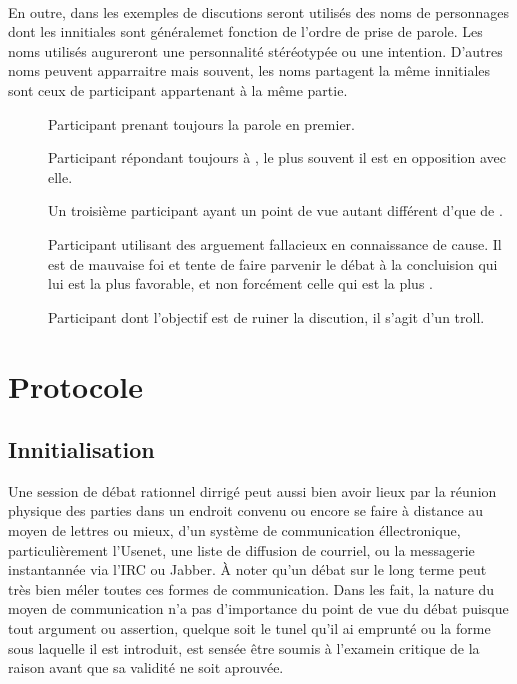 \paragraph{}
En outre, dans les exemples de discutions seront utilisés des noms de personnages dont les innitiales sont généralemet fonction de l’ordre de prise de parole. Les noms utilisés augureront une personnalité stéréotypée ou une intention. D’autres noms peuvent apparraitre mais souvent, les noms partagent la même innitiales sont ceux de participant appartenant à la même partie.

\begin{description}
  \item[\A] Participant prenant toujours la parole en premier.
  \item[\B] Participant répondant toujours à \A, le plus souvent il est en opposition avec elle.
  \item[\C] Un troisième participant ayant un point de vue autant différent d’\A que de \B.
  \item[\Sophist] Participant utilisant des arguement fallacieux en connaissance de cause. Il est de mauvaise foi et tente de faire parvenir le débat à la concluision qui lui est la plus favorable, et non forcément celle qui est la plus .
  \item[\Troll] Participant dont l’objectif est de ruiner la discution, il s’agit d’un troll.
\end{description}

\section{Protocole}
\subsection{Innitialisation}
Une session de débat rationnel dirrigé peut aussi bien avoir lieux par la réunion physique des parties dans un endroit convenu ou encore se faire à distance au moyen de lettres ou mieux, d’un système de communication éllectronique, particulièrement l’Usenet, une liste de diffusion de courriel, ou la messagerie instantannée via l’IRC ou Jabber. À noter qu’un débat sur le long terme peut très bien méler toutes ces formes de communication. Dans les fait, la nature du moyen de communication n’a pas d’importance du point de vue du débat puisque tout argument ou assertion, quelque soit le tunel qu’il ai emprunté ou la forme sous laquelle il est introduit, est sensée être soumis à l’examein critique de la raison avant que sa validité ne soit aprouvée.

